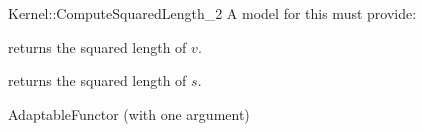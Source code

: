 \begin{ccRefFunctionObjectConcept}{Kernel::ComputeSquaredLength_2}
A model for this must provide:


       {returns the squared length of $v$. }

       {returns the squared length of $s$. }

\ccRefines
AdaptableFunctor (with one argument)

\ccSeeAlso
{} \\
 \\

\end{ccRefFunctionObjectConcept}
